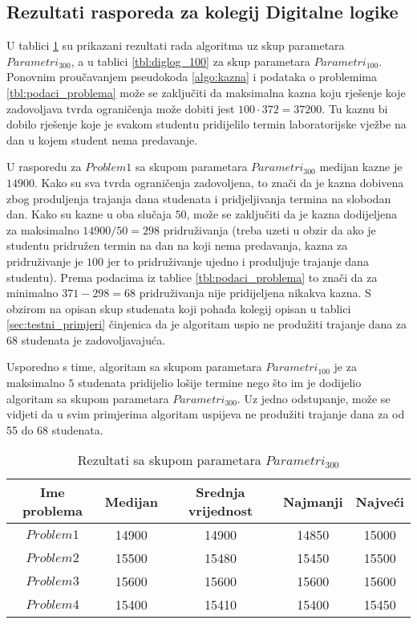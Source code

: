 \documentclass[times, utf8, zavrsni]{fer}
\begin{document}
\subsection{Rezultati rasporeda za kolegij Digitalne logike}
U tablici \ref{tbl:diglog_300} su prikazani rezultati rada algoritma uz skup parametara $Parametri_{300}$, a u tablici \ref{tbl:diglog_100} za skup parametara $Parametri_{100}$.
Ponovnim proučavanjem pseudokoda \ref{algo:kazna} i podataka o problemima \ref{tbl:podaci_problema} može se zaključiti da maksimalna kazna koju rješenje koje zadovoljava
tvrda ograničenja može dobiti jest $100 \cdot 372 = 37200$. Tu kaznu bi dobilo rješenje koje je svakom studentu pridijelilo termin laboratorijske vježbe na dan u kojem
student nema predavanje.

U rasporedu za $Problem1$ sa skupom parametara $Parametri_{300}$ medijan kazne je $14900$. Kako su sva tvrda ograničenja zadovoljena, to znači da je kazna dobivena zbog
produljenja trajanja dana studenata i pridjeljivanja termina na slobodan dan. Kako su kazne u oba slučaja $50$, može se zaključiti da je kazna dodijeljena za
maksimalno $14900 / 50 = 298$ pridruživanja (treba uzeti u obzir da ako je studentu pridružen termin na dan na koji nema predavanja, kazna za pridruživanje je $100$ jer
to pridruživanje ujedno i produljuje trajanje dana studentu). Prema podacima iz tablice \ref{tbl:podaci_problema} to znači da za minimalno $371 - 298 = 68$ pridruživanja nije
pridijeljena nikakva kazna. S obzirom na opisan skup studenata koji pohađa kolegij opisan u tablici \ref{sec:testni_primjeri} činjenica da je algoritam uspio ne produžiti
trajanje dana za $68$ studenata je zadovoljavajuća.

Usporedno s time, algoritam sa skupom parametara $Parametri_{100}$ je za maksimalno $5$ studenata pridijelio lošije termine nego što im je dodijelio algoritam sa skupom parametara
$Parametri_{300}$. Uz jedno odstupanje, može se vidjeti da u svim primjerima algoritam uspijeva ne produžiti trajanje dana za od 55 do 68 studenata.




\begin{table}
  \caption{Rezultati sa skupom parametara $Parametri_{300}$}
  \label{tbl:diglog_300}
  \centering
  \begin{tabular}{c | c | c | c | c }
    Ime problema &  Medijan & Srednja vrijednost & Najmanji & Najveći \\ \hline
    $Problem1$ & 14900 & 14900 & 14850 & 15000 \\ \hline
    $Problem2$ & 15500 & 15480 & 15450 & 15500 \\ \hline
    $Problem3$ & 15600 & 15600 & 15600 & 15600 \\ \hline
    $Problem4$ & 15400 & 15410 & 15400 & 15450
  \end{tabular}
\end{table}
\end{document}
